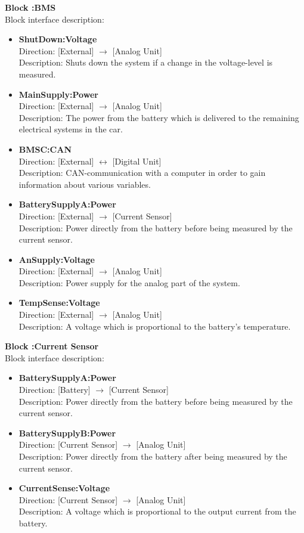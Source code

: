 \textbf{Block :BMS}\\
Block interface description:
\begin{itemize}
	\item \textbf{ShutDown:Voltage}\\
	Direction: [External] $\rightarrow$ [Analog Unit]\\
	Description: Shuts down the system if a change in the voltage-level is measured.
	\item \textbf{MainSupply:Power}\\
	Direction: [External] $\rightarrow$ [Analog Unit]\\
	Description: The power from the battery which is delivered to the remaining electrical systems in the car.
	\item \textbf{BMSC:CAN}\\
	Direction: [External] $\leftrightarrow$ [Digital Unit]\\
	Description: CAN-communication with a computer in order to gain information about various variables.
	\item \textbf{BatterySupplyA:Power}\\
	Direction: [External] $\rightarrow$ [Current Sensor]\\
	Description: Power directly from the battery before being measured by the current sensor.
	\item \textbf{AnSupply:Voltage}\\
	Direction: [External] $\rightarrow$ [Analog Unit]\\
	Description: Power supply for the analog part of the system.
	\item \textbf{TempSense:Voltage}\\
	Direction: [External] $\rightarrow$ [Analog Unit]\\
	Description: A voltage which is proportional to the battery's temperature.
\end{itemize}

\textbf{Block :Current Sensor}\\
Block interface description:
\begin{itemize}
	\item \textbf{BatterySupplyA:Power}\\
	Direction: [Battery] $\rightarrow$ [Current Sensor]\\
	Description: Power directly from the battery before being measured by the current sensor.
	\item \textbf{BatterySupplyB:Power}\\
	Direction: [Current Sensor] $\rightarrow$ [Analog Unit]\\
	Description: Power directly from the battery after being measured by the current sensor.
	\item \textbf{CurrentSense:Voltage}\\
	Direction: [Current Sensor] $\rightarrow$ [Analog Unit]\\
	Description: A voltage which is proportional to the output current from the battery.
\end{itemize}

